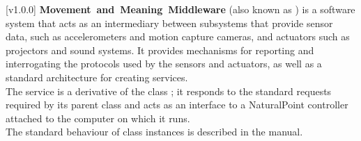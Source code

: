 [v1.0.0]
\textbf{Movement~and~Meaning~Middleware} (also known as \mplusm) is a software system
that acts as an intermediary between subsystems that provide sensor data, such as
accelerometers and motion capture cameras, and actuators such as projectors and sound
systems.
It provides mechanisms for reporting and interrogating the protocols used by the sensors
and actuators, as well as a standard architecture for creating services.\\

The \NPI{} service is a derivative of the \mplusm{} class ;
it responds to the standard requests required by its parent class and acts as an interface
to a NaturalPoint controller attached to the computer on which it runs.\\

The standard behaviour of  class instances is described in
the \emph{\MMM} manual.
\primaryEnd{}
